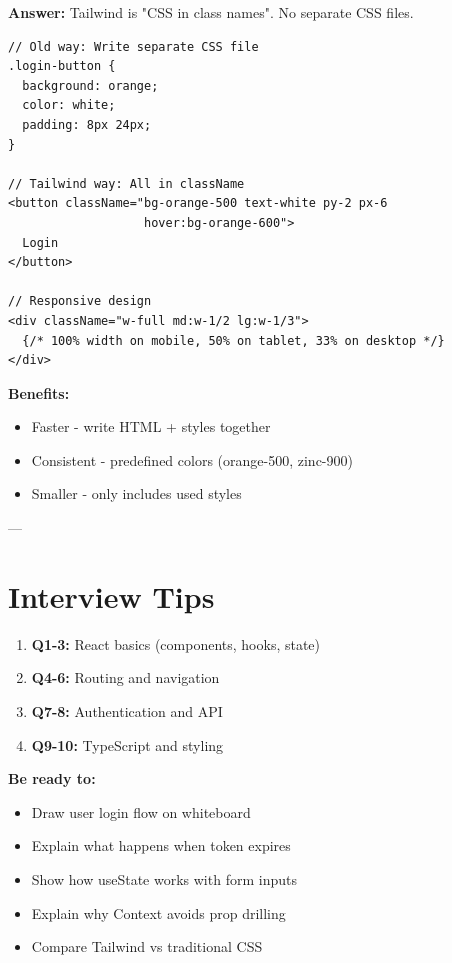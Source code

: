 \documentclass[11pt]{article}
\begin{document}
\textbf{Answer:} Tailwind is "CSS in class names". No separate CSS files.

\begin{lstlisting}
// Old way: Write separate CSS file
.login-button {
  background: orange;
  color: white;
  padding: 8px 24px;
}

// Tailwind way: All in className
<button className="bg-orange-500 text-white py-2 px-6 
                   hover:bg-orange-600">
  Login
</button>

// Responsive design
<div className="w-full md:w-1/2 lg:w-1/3">
  {/* 100% width on mobile, 50% on tablet, 33% on desktop */}
</div>
\end{lstlisting}

\textbf{Benefits:}
\begin{itemize}
    \item Faster - write HTML + styles together
    \item Consistent - predefined colors (orange-500, zinc-900)
    \item Smaller - only includes used styles
\end{itemize}

---

\section*{Interview Tips}

\begin{enumerate}
    \item \textbf{Q1-3:} React basics (components, hooks, state)
    \item \textbf{Q4-6:} Routing and navigation
    \item \textbf{Q7-8:} Authentication and API
    \item \textbf{Q9-10:} TypeScript and styling
\end{enumerate}

\textbf{Be ready to:}
\begin{itemize}
    \item Draw user login flow on whiteboard
    \item Explain what happens when token expires
    \item Show how useState works with form inputs
    \item Explain why Context avoids prop drilling
    \item Compare Tailwind vs traditional CSS
\end{itemize}
\end{document}

